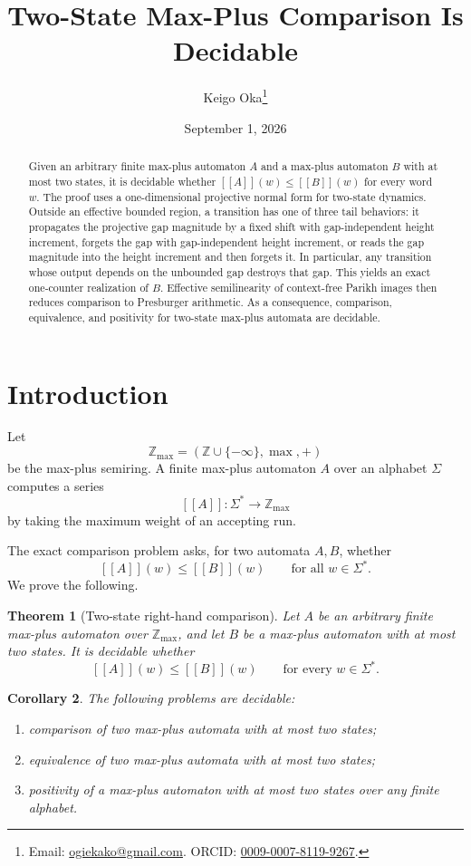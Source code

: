 \documentclass[11pt]{article}
\title{Two-State Max-Plus Comparison Is Decidable}
\author{Keigo Oka\thanks{Email: \href{mailto:ogiekako@gmail.com}{ogiekako@gmail.com}. ORCID: \href{https://orcid.org/0009-0007-8119-9267}{0009-0007-8119-9267}.}}
\date{September 1, 2026}
\newtheorem{theorem}{Theorem}[section]
\newtheorem{corollary}[theorem]{Corollary}
\newcommand{\Zmax}{\mathbb{Z}_{\max}}
\newcommand{\minf}{-\infty}
\newcommand{\eval}[1]{[\![#1]\!]}
\begin{document}
\maketitle

\begin{abstract}
Given an arbitrary finite max-plus automaton $A$ and a max-plus automaton $B$ with at most two states, it is decidable whether $\eval{A}(w)\leq \eval{B}(w)$ for every word $w$. The proof uses a one-dimensional projective normal form for two-state dynamics. Outside an effective bounded region, a transition has one of three tail behaviors: it propagates the projective gap magnitude by a fixed shift with gap-independent height increment, forgets the gap with gap-independent height increment, or reads the gap magnitude into the height increment and then forgets it. In particular, any transition whose output depends on the unbounded gap destroys that gap. This yields an exact one-counter realization of $B$. Effective semilinearity of context-free Parikh images then reduces comparison to Presburger arithmetic. As a consequence, comparison, equivalence, and positivity for two-state max-plus automata are decidable.
\end{abstract}

\section{Introduction}

Let
\[
\Zmax=(\mathbb Z\cup\{\minf\},\max,+)
\]
be the max-plus semiring. A finite max-plus automaton $A$ over an alphabet $\Sigma$ computes a series
\[
\eval{A}:\Sigma^*\longrightarrow \Zmax
\]
by taking the maximum weight of an accepting run.

The exact comparison problem asks, for two automata $A,B$, whether
\[
\eval{A}(w)\leq \eval{B}(w)\qquad\text{for all }w\in\Sigma^*.
\]
We prove the following.

\begin{theorem}[Two-state right-hand comparison]\label{thm:main}
Let $A$ be an arbitrary finite max-plus automaton over $\Zmax$, and let $B$ be a max-plus automaton with at most two states. It is decidable whether
\[
\eval{A}(w)\leq \eval{B}(w)
\qquad\text{for every }w\in\Sigma^*.
\]
\end{theorem}

\begin{corollary}\label{cor:basic}
The following problems are decidable:
\begin{enumerate}[label=(\roman*)]
\item comparison of two max-plus automata with at most two states;
\item equivalence of two max-plus automata with at most two states;
\item positivity of a max-plus automaton with at most two states over any finite alphabet.
\end{enumerate}
\end{corollary}
\end{document}
